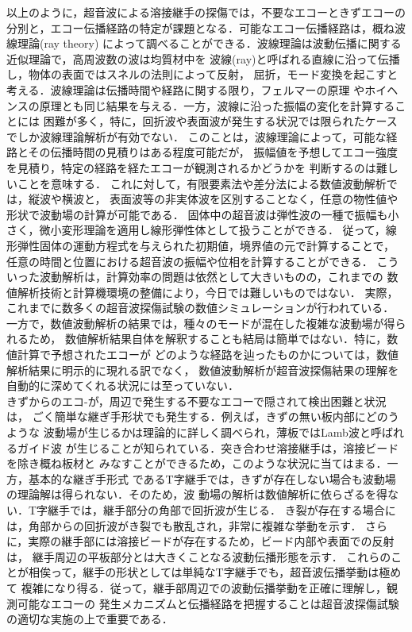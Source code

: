 %
%
以上のように，超音波による溶接継手の探傷では，不要なエコーときずエコーの
分別と，エコー伝播経路の特定が課題となる．可能なエコー伝播経路は，概ね波線理論(ray theory)
によって調べることができる．波線理論は波動伝播に関する近似理論で，高周波数の波は均質材中を
波線(ray)と呼ばれる直線に沿って伝播し，物体の表面ではスネルの法則によって反射，
屈折，モード変換を起こすと考える．波線理論は伝播時間や経路に関する限り，フェルマーの原理
やホイヘンスの原理とも同じ結果を与える．一方，波線に沿った振幅の変化を計算することには
困難が多く，特に，回折波や表面波が発生する状況では限られたケースでしか波線理論解析が有効でない．
このことは，波線理論によって，可能な経路とその伝播時間の見積りはある程度可能だが，
振幅値を予想してエコー強度を見積り，特定の経路を経たエコーが観測されるかどうかを
判断するのは難しいことを意味する．
これに対して，有限要素法や差分法による数値波動解析では，縦波や横波と，
表面波等の非実体波を区別することなく，任意の物性値や形状で波動場の計算が可能である．
固体中の超音波は弾性波の一種で振幅も小さく，微小変形理論を適用し線形弾性体として扱うことができる．
従って，線形弾性固体の運動方程式を与えられた初期値，境界値の元で計算することで，
任意の時間と位置における超音波の振幅や位相を計算することができる\cite{JDA}．
こういった波動解析は，計算効率の問題は依然として大きいものの，これまでの
数値解析技術と計算機環境の整備により，今日では難しいものではない．
実際，これまでに数多くの超音波探傷試験の数値シミュレーションが行われている．
一方で，数値波動解析の結果では，種々のモードが混在した複雑な波動場が得られるため，
数値解析結果自体を解釈することも結局は簡単ではない．特に，数値計算で予想されたエコーが
どのような経路を辿ったものかについては，数値解析結果に明示的に現れる訳でなく，
数値波動解析が超音波探傷結果の理解を自動的に深めてくれる状況には至っていない．\\

%
%
きずからのエコ-が，周辺で発生する不要なエコーで隠されて検出困難と状況は，
ごく簡単な継ぎ手形状でも発生する．例えば，きずの無い板内部にどのうような
波動場が生じるかは理論的に詳しく調べられ，薄板ではLamb波と呼ばれるガイド波
が生じることが知られている．突き合わせ溶接継手は，溶接ビードを除き概ね板材と
みなすことができるため，このような状況に当てはまる．一方，基本的な継ぎ手形式
であるT字継手では，きずが存在しない場合も波動場の理論解は得られない．そのため，波
動場の解析は数値解析に依らざるを得ない．T字継手では，継手部分の角部で回折波が生じる．
き裂が存在する場合には，角部からの回折波がき裂でも散乱され，非常に複雑な挙動を示す．
さらに，実際の継手部には溶接ビードが存在するため，ビード内部や表面での反射は，
継手周辺の平板部分とは大きくことなる波動伝播形態を示す．
これらのことが相俟って，継手の形状としては単純なT字継手でも，超音波伝播挙動は極めて
複雑になり得る．従って，継手部周辺での波動伝播挙動を正確に理解し，観測可能なエコーの
発生メカニズムと伝播経路を把握することは超音波探傷試験の適切な実施の上で重要である．
